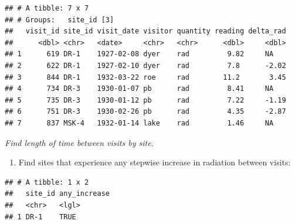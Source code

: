 \documentclass[]{Nemilov}
\newenvironment{Shaded}{\begin{snugshade}}{\end{snugshade}}
\newcommand{\DataTypeTok}[1]{\textcolor[rgb]{0.13,0.29,0.53}{#1}}
\newcommand{\DecValTok}[1]{\textcolor[rgb]{0.00,0.00,0.81}{#1}}
\newcommand{\KeywordTok}[1]{\textcolor[rgb]{0.13,0.29,0.53}{\textbf{#1}}}
\newcommand{\NormalTok}[1]{#1}
\newcommand{\OperatorTok}[1]{\textcolor[rgb]{0.81,0.36,0.00}{\textbf{#1}}}
\newcommand{\StringTok}[1]{\textcolor[rgb]{0.31,0.60,0.02}{#1}}
\providecommand{\tightlist}{%
  \setlength{\itemsep}{0pt}\setlength{\parskip}{0pt}}
\begin{document}
\begin{verbatim}
## # A tibble: 7 x 7
## # Groups:   site_id [3]
##   visit_id site_id visit_date visitor quantity reading delta_rad
##      <dbl> <chr>   <date>     <chr>   <chr>      <dbl>     <dbl>
## 1      619 DR-1    1927-02-08 dyer    rad         9.82     NA   
## 2      622 DR-1    1927-02-10 dyer    rad         7.8      -2.02
## 3      844 DR-1    1932-03-22 roe     rad        11.2       3.45
## 4      734 DR-3    1930-01-07 pb      rad         8.41     NA   
## 5      735 DR-3    1930-01-12 pb      rad         7.22     -1.19
## 6      751 DR-3    1930-02-26 pb      rad         4.35     -2.87
## 7      837 MSK-4   1932-01-14 lake    rad         1.46     NA
\end{verbatim}

\emph{Find length of time between visits by site.}

\begin{enumerate}
\def\labelenumi{\arabic{enumi}.}
\setcounter{enumi}{9}
\tightlist
\item
  Find sites that experience any stepwise increase in radiation between visits:
\end{enumerate}

\begin{Shaded}
\end{Shaded}

\begin{verbatim}
## # A tibble: 1 x 2
##   site_id any_increase
##   <chr>   <lgl>       
## 1 DR-1    TRUE
\end{verbatim}
\end{document}
